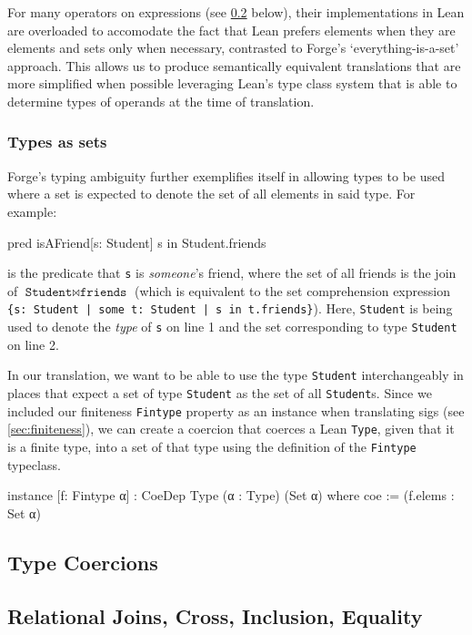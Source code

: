 For many operators on expressions (see \cref{sec:join-cross-subset} below), their implementations in Lean are overloaded to accomodate the fact that Lean prefers elements when they are elements and sets only when necessary, contrasted to Forge's `everything-is-a-set' approach. This allows us to produce semantically equivalent translations that are more simplified when possible leveraging Lean's type class system that is able to determine types of operands at the time of translation. 

\subsubsection{Types as sets}
Forge's typing ambiguity further exemplifies itself in allowing types to be used where a set is expected to denote the set of all elements in said type. For example:
\begin{forge}
pred isAFriend[s: Student] {
  s in Student.friends
}
\end{forge}
is the predicate that \texttt{s} is \emph{someone}'s friend, where the set of all friends is the join of $\texttt{Student} \bowtie \texttt{friends}$ (which is equivalent to the set comprehension expression \texttt{\{s: Student | some t: Student | s in t.friends\}}). Here, \texttt{Student} is being used to denote the \emph{type} of \texttt{s} on line 1 and the set corresponding to type \texttt{Student} on line 2. 

In our translation, we want to be able to use the type \texttt{Student} interchangeably in places that expect a set of type \texttt{Student} as the set of all \texttt{Student}s. Since we included our finiteness \texttt{Fintype} property as an instance when translating sigs (see \cref{sec:finiteness}), we can create a coercion that coerces a Lean \texttt{Type}, given that it is a finite type, into a set of that type using the definition of the \texttt{Fintype} typeclass. 
\begin{leanimpl*}
instance [f: Fintype α] : CoeDep Type (α : Type) (Set α) where
  coe := (f.elems : Set α)
\end{leanimpl*}

\subsection{Type Coercions}

\subsection{Relational Joins, Cross, Inclusion, Equality}\label{sec:join-cross-subset}

